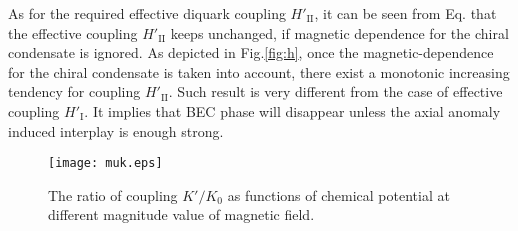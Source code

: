 \documentclass[prd, showpacs,nofootinbib,amsmath,amssymb]{revtex4}
\begin{document}
As for  the  required effective diquark  coupling $H'_\text{II}$, it can be seen from Eq. that the effective coupling $H'_\text{II}$  keeps  unchanged, if magnetic dependence for the chiral condensate is  ignored.
As depicted in Fig.\ref{fig:h}, once   the magnetic-dependence for the chiral condensate is taken into account, there exist a monotonic increasing tendency for coupling $H'_\text{II}$.
Such result is very different from the case of effective coupling $H'_\text{I}$.
It implies that  BEC  phase will disappear unless the axial anomaly induced interplay is enough strong.




\begin{figure}[h]
  \caption{  The ratio of  coupling $K'/K_0$ as  functions of
  chemical potential at different magnitude value of magnetic field.}
  \centering
    \texttt{[image: muk.eps]}
    \label{fig:muk}
\end{figure}
\end{document}
